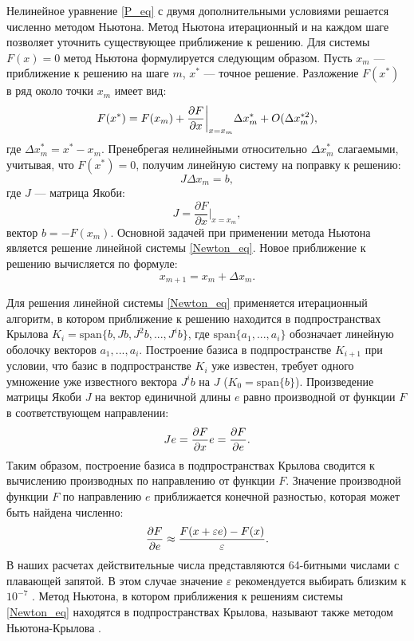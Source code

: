 Нелинейное уравнение \eqref{P_eq} с двумя дополнительными условиями решается численно методом Ньютона. Метод Ньютона итерационный и на каждом шаге позволяет уточнить существующее приближение к решению. Для системы $F(x) = 0$ метод Ньютона формулируется следующим образом. Пусть $x_m$ --- приближение к решению на шаге $m$, $x^*$ --- точное решение. Разложение $F(x^*)$ в ряд около точки $x_m$ имеет вид:
\begin{equation}
F(x^*) = F(x_m) + \frac{\partial F}{\partial x}\bigg|_{x=x_m} \Delta x_m^* + O(\Delta x_m^{*2}), 
\end{equation}
где $\Delta x_m^* = x^* - x_m$. Пренебрегая нелинейными относительно $\Delta x_m^*$ слагаемыми, учитывая, что $F(x^*) = 0$, получим линейную систему на поправку к решению:
\begin{equation}\label{Newton_eq}
J \Delta x_m = b,
\end{equation}
где $J$ --- матрица Якоби:
$$
J = \frac{\partial F}{\partial x}\bigg|_{x = x_m},
$$
вектор $b = - F(x_m)$. 
Основной задачей при применении метода Ньютона является решение линейной системы \eqref{Newton_eq}. Новое приближение к решению вычисляется по формуле: 
\begin{equation} \label{end_NK_eq}
x_{m+1} = x_m + \Delta x_m. 
\end{equation}

Для решения линейной системы \eqref{Newton_eq} применяется итерационный алгоритм, в котором приближение к решению находится в подпространствах Крылова $K_i = \mathrm{span}\{b, Jb, J^2b, ... , J^ib\}$, где $\mathrm{span}\{a_1, ..., a_i\}$ обозначает линейную оболочку векторов $a_1, ..., a_i$. Построение базиса в подпространстве $K_{i+1}$ при условии, что базис в подпространстве $K_i$ уже известен, требует одного умножение уже известного вектора $J^ib$ на $J$ ($K_0 = \mathrm{span}\{b\}$). Произведение матрицы Якоби $J$ на вектор единичной длины $e$ равно производной от функции $F$ в соответствующем направлении:
\begin{equation} \label{Je_eq}
Je = \frac{\partial F}{\partial x} e = \frac{\partial F}{\partial e}. 
\end{equation}
Таким образом, построение базиса в подпространствах Крылова сводится к вычислению производных по направлению от функции $F$. Значение производной функции $F$ по направлению $e$ приближается конечной разностью, которая может быть найдена численно:
\begin{equation}\label{fd_eq}
\frac{\partial F}{\partial e} \approx \frac{F(x + \varepsilon e) - F(x)}{\varepsilon}.
\end{equation}
В наших расчетах действительные числа представляются 64-битными числами с плавающей запятой. В этом случае значение $\varepsilon$ рекомендуется выбирать близким к $10^{-7}$ \cite{Viswanath2007}. Метод Ньютона, в котором приближения к решениям системы \eqref{Newton_eq} находятся в подпространствах Крылова, называют также методом Ньютона-Крылова \cite{Sanchez2004}. 

